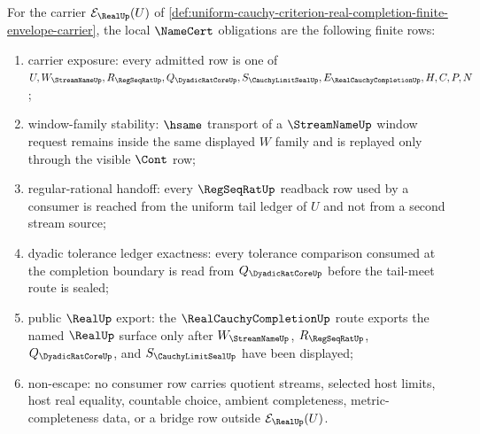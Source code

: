 \begin{theorem}
\label{thm:uniform-cauchy-criterion-real-completion-finite-envelope-namecert-obligations}
For the carrier $\mathcal{E}_{\RealUp}(U)$ of \autoref{def:uniform-cauchy-criterion-real-completion-finite-envelope-carrier}, the local $\NameCert$ obligations are the following finite rows:
\begin{enumerate}
\item carrier exposure: every admitted row is one of $U,W_{\StreamNameUp},R_{\RegSeqRatUp},Q_{\DyadicRatCoreUp},S_{\CauchyLimitSealUp},E_{\RealCauchyCompletionUp},H,C,P,N$;
\item window-family stability: $\hsame$ transport of a $\StreamNameUp$ window request remains inside the same displayed $W$ family and is replayed only through the visible $\Cont$ row;
\item regular-rational handoff: every $\RegSeqRatUp$ readback row used by a consumer is reached from the uniform tail ledger of $U$ and not from a second stream source;
\item dyadic tolerance ledger exactness: every tolerance comparison consumed at the completion boundary is read from $Q_{\DyadicRatCoreUp}$ before the tail-meet route is sealed;
\item public $\RealUp$ export: the $\RealCauchyCompletionUp$ route exports the named $\RealUp$ surface only after $W_{\StreamNameUp}$, $R_{\RegSeqRatUp}$, $Q_{\DyadicRatCoreUp}$, and $S_{\CauchyLimitSealUp}$ have been displayed;
\item non-escape: no consumer row carries quotient streams, selected host limits, host real equality, countable choice, ambient completeness, metric-completeness data, or a bridge row outside $\mathcal{E}_{\RealUp}(U)$.
\end{enumerate}
\end{theorem}
